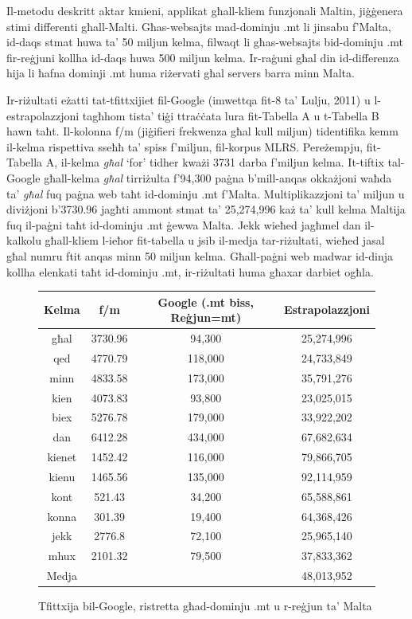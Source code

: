 \documentclass[]{../../metanetpaper}
\begin{document}
\begin{multicols}{2}
Il-metodu deskritt aktar kmieni, applikat għall-kliem funzjonali Maltin, jiġġenera stimi differenti għall-Malti. Għas-websajts mad-dominju .mt li jinsabu f'Malta, id-daqs stmat huwa ta’ 50 miljun kelma, filwaqt li għas-websajts bid-dominju .mt fir-reġjuni kollha id-daqs huwa 500 miljun kelma. Ir-raġuni għal din id-differenza hija li ħafna dominji .mt huma riżervati għal servers barra minn Malta.
    
Ir-riżultati eżatti tat-tfittxijiet fil-Google (imwettqa fit-8 ta’ Lulju, 2011) u l-estrapolazzjoni tagħhom tista’ tiġi ttraċċata lura fit-Tabella A u t-Tabella B hawn taħt. Il-kolonna f/m (jiġifieri frekwenza għal kull miljun) tidentifika kemm il-kelma rispettiva sseħħ ta’ spiss f’miljun, fil-korpus MLRS. Pereżempju, fit-Tabella A, il-kelma \emph{għal} ‘for’ tidher kważi 3731 darba f’miljun kelma. It-tiftix tal-Google għall-kelma \emph{għal} tirriżulta f’94,300 paġna b’mill-anqas okkażjoni waħda ta’ \emph{għal} fuq paġna web taħt id-dominju .mt f'Malta. Multiplikazzjoni ta’ miljun u diviżjoni b’3730.96 jagħti ammont stmat ta’ 25,274,996 każ ta’ kull kelma Maltija fuq il-paġni taħt id-dominju .mt ġewwa Malta. Jekk wieħed jagħmel dan il-kalkolu għall-kliem l-ieħor fit-tabella u jsib il-medja tar-riżultati, wieħed jasal għal numru ftit anqas minn 50 miljun kelma. Għall-paġni web madwar id-dinja kollha elenkati taħt id-dominju .mt, ir-riżultati huma għaxar darbiet ogħla.

\begin{figure}[tb]
\centering
\begin{tabular}{|c|c|c|c|} %
\hline
Kelma  & f/m & Google (.mt biss, Reġjun=mt) & Estrapolazzjoni  \\
\hline
għal & 3730.96 & 94,300 & 25,274,996 \\
qed	& 4770.79 & 118,000 & 24,733,849 \\
minn & 4833.58 & 173,000 & 35,791,276 \\
kien & 4073.83 & 93,800 & 23,025,015 \\
biex & 5276.78 & 179,000 & 33,922,202 \\
dan	& 6412.28 & 434,000 & 67,682,634 \\
kienet & 1452.42 & 116,000 & 79,866,705 \\
kienu & 1465.56 & 135,000 & 92,114,959 \\
kont & 521.43 & 34,200 & 65,588,861 \\
konna & 301.39 & 19,400 & 64,368,426 \\
jekk & 2776.8 & 72,100 & 25,965,140 \\
mhux & 2101.32 & 79,500 & 37,833,362 \\
\hline
Medja & & & 48,013,952 \\
\hline
\end{tabular}
\caption{Tfittxija bil-Google, ristretta għad-dominju .mt u r-reġjun ta’ Malta}
\label{table:Google_A_mt}
\end{figure}


\end{multicols}
\end{document}
